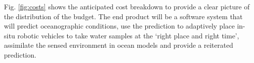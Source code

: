 




\noindent
Fig. \ref{fig:costs} shows the anticipated cost breakdown to provide a
clear picture of the distribution of the budget. The end product will
be a software system that will predict oceanographic conditions, use
the prediction to adaptively place in-situ robotic vehicles to take
water samples at the ‘right place and right time’, assimilate the
sensed environment in ocean models and provide a reiterated
prediction. 

